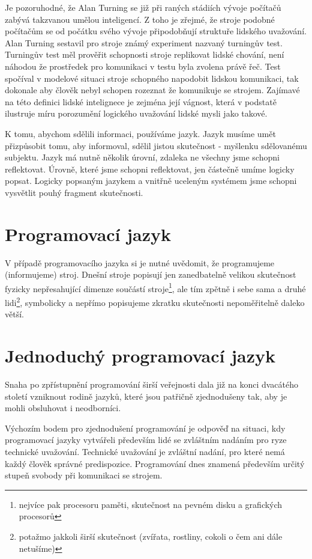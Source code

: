 \documentclass[11pt]{book}
\newcommand{\oddil}[1]{\section{#1}\label{sec:#1}}
\begin{document}
Je pozoruhodné, že Alan Turning se již při raných stádiích vývoje počítačů zabývá takzvanou umělou inteligencí. Z toho je zřejmé, že stroje podobné počítačům se od počátku svého vývoje připodobňují struktuře lidského uvažování. Alan Turning sestavil pro stroje známý experiment nazvaný turningův test. Turningův test měl prověřit schopnosti stroje replikovat lidské chování, není náhodou že prostředek pro komunikaci v testu byla zvolena právě řeč. Test spočíval v modelové situaci stroje schopného napodobit lidskou komunikaci, tak dokonale aby člověk nebyl schopen rozeznat že komunikuje se strojem. Zajímavé na této definici lidské intelignece je zejména její vágnost, která v podstatě ilustruje míru porozumění logického uvažování lidské mysli jako takové.




K tomu, abychom sdělili informaci, používáme jazyk. Jazyk musíme umět přizpůsobit tomu, aby informoval, sdělil jistou skutečnost - myšlenku sdělovanému subjektu. Jazyk má nutně několik úrovní, zdaleka ne všechny jsme schopni reflektovat. Úrovně, které jsme schopni reflektovat, jen částečně umíme logicky popsat. Logicky popsaným jazykem a vnitřně uceleným systémem jsme schopni vysvětlit pouhý fragment skutečnosti.


\oddil{Programovací jazyk}

V případě programovacího jazyka si je nutné uvědomit, že programujeme (informujeme) stroj. Dnešní stroje popisují jen zanedbatelně velikou skutečnost fyzicky nepřesahující dimenze součástí stroje\footnote{nejvíce pak procesoru paměti, skutečnost na pevném disku a grafických procesorů}, ale tím zpětně i sebe sama a druhé lidi\footnote{potažmo jakkoli širší skutečnost (zvířata, rostliny, cokoli o čem ani dále netušíme)}, symbolicky a nepřímo popisujeme zkratku skutečnosti nepoměřitelně daleko větší.



\oddil{Jednoduchý programovací jazyk}

Snaha po  zpřístupnění programování širší veřejnosti dala již na konci dvacátého století vzniknout rodině jazyků, které jsou patřičně zjednodušeny tak, aby je mohli obsluhovat i neodborníci.

Výchozím bodem pro zjednodušení programování je odpověď na situaci, kdy programovací jazyky vytvářeli především lidé se zvláštním nadáním pro ryze technické uvažování. Technické uvažování je zvláštní nadání, pro které nemá každý člověk správné predispozice. Programování dnes znamená především určitý stupeň svobody při komunikaci se strojem.
\end{document}
